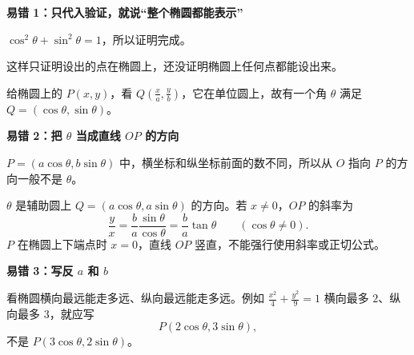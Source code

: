\begin{trapbox}
\textbf{\textcolor{CTrap}{易错 1：只代入验证，就说“整个椭圆都能表示”}}
\begin{description}[style=nextline,leftmargin=2.8em,labelsep=0.5em,itemsep=0.35em]
\item[\textbf{常见说法：}] $\cos^2\theta+\sin^2\theta=1$，所以证明完成。
\item[\textbf{问题在哪里：}] 这样只证明设出的点在椭圆上，还没证明椭圆上任何点都能设出来。
\item[\textbf{正确补充：}] 给椭圆上的 $P(x,y)$，看 $Q(\frac xa,\frac yb)$，它在单位圆上，故有一个角 $\theta$ 满足 $Q=(\cos\theta,\sin\theta)$。
\end{description}

\medskip
\par\noindent\begin{minipage}{\linewidth}
\textbf{\textcolor{CTrap}{易错 2：把 $\theta$ 当成直线 $OP$ 的方向}}


\end{minipage}\par
\begin{description}[style=nextline,leftmargin=2.8em,labelsep=0.5em,itemsep=0.35em]
\item[\textbf{错在哪里：}] $P=(a\cos\theta,b\sin\theta)$ 中，横坐标和纵坐标前面的数不同，所以从 $O$ 指向 $P$ 的方向一般不是 $\theta$。
\item[\textbf{正确理解：}] $\theta$ 是辅助圆上 $Q=(a\cos\theta,a\sin\theta)$ 的方向。若 $x\ne0$，$OP$ 的斜率为
\[
\frac{y}{x}=\frac ba\frac{\sin\theta}{\cos\theta}
=\frac ba\tan\theta\qquad(\cos\theta\ne0).
\]
$P$ 在椭圆上下端点时 $x=0$，直线 $OP$ 竖直，不能强行使用斜率或正切公式。
\end{description}

\medskip
\par\noindent\begin{minipage}{\linewidth}
\textbf{\textcolor{CTrap}{易错 3：写反 $a$ 和 $b$}}


\end{minipage}\par
\begin{description}[style=nextline,leftmargin=2.8em,labelsep=0.5em,itemsep=0.35em]
\item[\textbf{检查方法：}] 看椭圆横向最远能走多远、纵向最远能走多远。例如 $\frac{x^2}{4}+\frac{y^2}{9}=1$ 横向最多 $2$、纵向最多 $3$，就应写
\[
P(2\cos\theta,3\sin\theta),
\]
不是 $P(3\cos\theta,2\sin\theta)$。
\end{description}


\end{trapbox}
